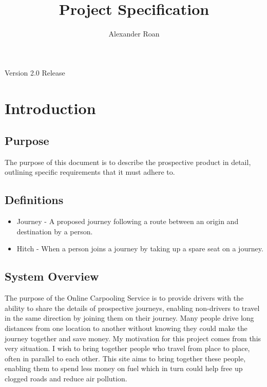 \documentclass[11pt]{article}
\begin{document}
\begin{titlepage}
\title{Project Specification}
\author{Alexander Roan}
\maketitle
\begin{center}
Version 2.0 Release
\end{center}
\end{titlepage}

\tableofcontents
\newpage
\section{Introduction}

\subsection{Purpose}
The purpose of this document is to describe the prospective product in detail, outlining specific requirements that it must adhere to.

\subsection{Definitions}
\begin{itemize}
\item Journey - A proposed journey following a route between an origin and destination by a person.
\item Hitch - When a person joins a journey by taking up a spare seat on a journey.
\end{itemize}

\subsection{System Overview}
The purpose of the Online Carpooling Service is to provide drivers with the ability to share the details of prospective journeys, enabling non-drivers to travel in the same direction by joining them on their journey. Many people drive long distances from one location to another without knowing they could make the journey together and save money. My motivation for this project comes from this very situation. I wish to bring together people who travel from place to place, often in parallel to each other. This site aims to bring together these people, enabling them to spend less money on fuel which in turn could help free up clogged roads and reduce air pollution.
\end{document}
